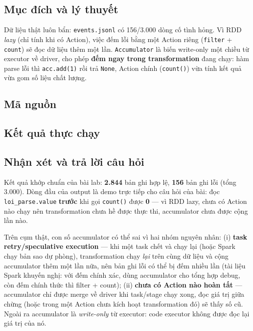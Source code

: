 \documentclass[12pt,a4paper,oneside]{article}
\begin{document}
\subsection{Mục đích và lý thuyết}

Dữ liệu thật luôn bẩn: \texttt{events.jsonl} có 156/3.000 dòng cố tình hỏng. Vì RDD \emph{lazy} (chỉ tính khi có Action), việc đếm lỗi bằng một Action riêng (\texttt{filter} + \texttt{count}) sẽ đọc dữ liệu thêm một lần. \texttt{Accumulator} là biến write-only một chiều từ executor về driver, cho phép \textbf{đếm ngay trong transformation} đang chạy: hàm parse lỗi thì \texttt{acc.add(1)} rồi trả \texttt{None}, Action chính (\texttt{count()}) vừa tính kết quả vừa gom số liệu chất lượng.

\subsection{Mã nguồn}



\subsection{Kết quả thực chạy}



\subsection{Nhận xét và trả lời câu hỏi}

Kết quả khớp chuẩn của bài lab: \textbf{2.844} bản ghi hợp lệ, \textbf{156} bản ghi lỗi (tổng 3.000). Dòng đầu của output là demo trực tiếp cho câu hỏi của bài: đọc \texttt{loi\_parse.value} \textbf{trước} khi gọi \texttt{count()} được \textbf{0} --- vì RDD lazy, chưa có Action nào chạy nên transformation chưa hề được thực thi, accumulator chưa được cộng lần nào.

Trên cụm thật, con số accumulator có thể sai vì hai nhóm nguyên nhân: (i) \textbf{task retry/speculative execution} --- khi một task chết và chạy lại (hoặc Spark chạy bản sao dự phòng), transformation chạy \emph{lại} trên cùng dữ liệu và cộng accumulator thêm một lần nữa, nên bản ghi lỗi có thể bị đếm nhiều lần (tài liệu Spark khuyến nghị: với đếm chính xác, dùng accumulator cho tổng hợp debug, còn đếm chính thức thì filter + count); (ii) \textbf{chưa có Action nào hoàn tất} --- accumulator chỉ được merge về driver khi task/stage chạy xong, đọc giá trị giữa chừng (hoặc trong một Action chưa kích hoạt transformation đó) sẽ thấy số cũ. Ngoài ra accumulator là \emph{write-only} từ executor: code executor không được đọc lại giá trị của nó.
\end{document}
